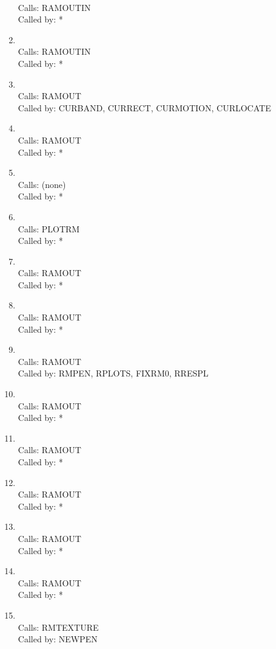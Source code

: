 \documentclass[11pt]{report}
\begin{document}
\begin{enumerate}
\\ Calls:  RAMOUTIN
\\ Called by: *
\item {}
\\ Calls: RAMOUTIN
\\ Called by: *
\item {}
\\ Calls: RAMOUT
\\ Called by: CURBAND, CURRECT, CURMOTION, CURLOCATE
\item {}
\\ Calls:  RAMOUT
\\ Called by: *
\item {}
\\ Calls:  (none)
\\ Called by: *
\item {}
\\ Calls:  PLOTRM
\\ Called by: *
\item {}
\\ Calls:  RAMOUT
\\ Called by: *
\item {}
\\ Calls:  RAMOUT
\\ Called by: *
\item {}
\\ Calls:  RAMOUT
\\ Called by: RMPEN, RPLOTS, FIXRM0, RRESPL
\item {}
\\ Calls:  RAMOUT
\\ Called by: *
\item {}
\\ Calls:  RAMOUT
\\ Called by: *
\item {}
\\ Calls:  RAMOUT
\\ Called by: *
\item {}
\\ Calls:  RAMOUT
\\ Called by: *
\item {}
\\ Calls:  RAMOUT
\\ Called by: *
\item {}
\\ Calls:  RMTEXTURE
\\ Called by: NEWPEN

\end{enumerate}
\end{document}
